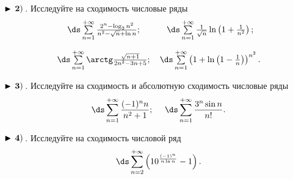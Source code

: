 $\bf\blacktriangleright\,2)\,$. Исследуйте на сходимость числовые ряды
\begin{equation*}
    \begin{array}{ccc}
        \,\ds\sum\limits_{n=1}^{+\infty}\frac{2^n-\log_2 n^2}{n^2-\sqrt{n}+\ln n}

        ; &   \,
\ds\sum\limits_{n=1}^{+\infty}\frac{1}{\sqrt{n}}\ln\left(1+\frac{1}{n^2}\right)

        ; \\[6mm]
        \,
\ds\sum\limits_{n=1}^{+\infty}\arctg\frac{\sqrt{n+1}}{2n^2-3n+5}

        ; &    \,
\ds\sum\limits_{n=1}^{+\infty}\left(1+\ln\left(1-\frac{1}{n}\right)\right)^{n^2}
        .
    \end{array}
\end{equation*}


$\bf\blacktriangleright\,3)\,$. Исследуйте на сходимость и абсолютную сходимость числовые ряды
\begin{equation*}
    \,\ds\sum\limits_{n=1}^{+\infty}\frac{(-1)^n n}{n^2+1}

    ;\quad\,   \,
\ds\sum\limits_{n=1}^{+\infty}\frac{3^n\sin n}{n!}

    .
\end{equation*}


$\bf\blacktriangleright\,4)\,$. Исследуйте на сходимость числовой ряд
\begin{equation*}
    \,
\ds\sum\limits_{n=2}^{+\infty}\left(10^{\frac{(-1)^n}{n\ln n}}-1\right)
    .
\end{equation*}
